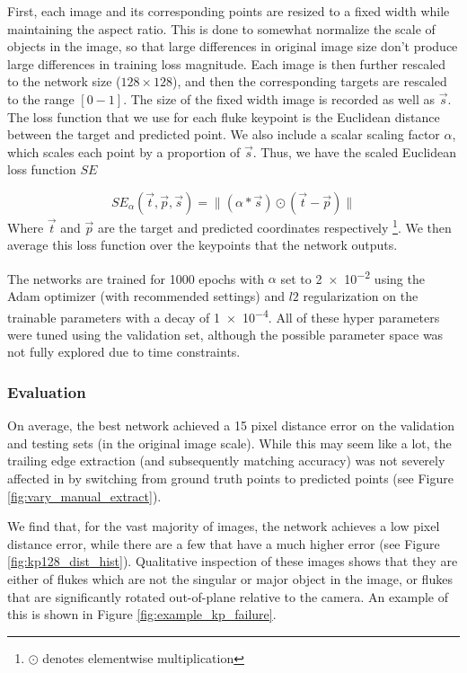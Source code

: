 First, each image and its corresponding points are resized to a fixed width while maintaining the aspect ratio.
This is done to somewhat normalize the scale of objects in the image, so that large differences in original image size don't produce large differences in training loss magnitude.
Each image is then further rescaled to the network size ($128 \times 128$), and then the corresponding targets are rescaled to the range $[0-1]$.
The size of the fixed width image is recorded as well as $\vec{s}$.
The loss function that we use for each fluke keypoint is the Euclidean distance between the target and predicted point.
We also include a scalar scaling factor $\alpha$, which scales each point by a proportion of $\vec{s}$.
Thus, we have the scaled Euclidean loss function $SE$

\begin{equation} \label{eqn:se_loss}
SE_{\alpha}(\vec{t}, \vec{p}, \vec{s}) = \lVert (\alpha * \vec{s}) \odot (\vec{t} - \vec{p}) \rVert
\end{equation} 
Where $\vec{t}$ and $\vec{p}$ are the target and predicted coordinates respectively \footnote{$\odot$ denotes elementwise multiplication}.
We then average this loss function over the keypoints that the network outputs.

The networks are trained for 1000 epochs with $\alpha$ set to \num{2e-2} using the Adam \cite{kingma2014adam} optimizer (with recommended settings) and $l2$ regularization on the trainable parameters with a decay of \num{1e-4}.
All of these hyper parameters were tuned using the validation set, although the possible parameter space was not fully explored due to time constraints.

\subsubsection{Evaluation} 

On average, the best network achieved a 15 pixel distance error on the validation and testing sets (in the original image scale).
While this may seem like a lot, the trailing edge extraction (and subsequently matching accuracy) was not severely affected in by switching from ground truth points to predicted points (see Figure \ref{fig:vary_manual_extract}). 

We find that, for the vast majority of images, the network achieves a low pixel distance error, while there are a few that have a much higher error (see Figure \ref{fig:kp128_dist_hist}).
Qualitative inspection of these images shows that they are either of flukes which are not the singular or major object in the image, or flukes that are significantly rotated out-of-plane relative to the camera.
An example of this is shown in Figure \ref{fig:example_kp_failure}.

